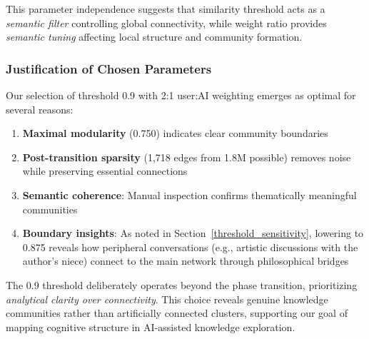 This parameter independence suggests that similarity threshold acts as a \emph{semantic filter} controlling global connectivity, while weight ratio provides \emph{semantic tuning} affecting local structure and community formation.

\subsubsection{Justification of Chosen Parameters}

Our selection of threshold 0.9 with 2:1 user:AI weighting emerges as optimal for several reasons:

\begin{enumerate}
    \item \textbf{Maximal modularity} (0.750) indicates clear community boundaries
    \item \textbf{Post-transition sparsity} (1,718 edges from 1.8M possible) removes noise while preserving essential connections
    \item \textbf{Semantic coherence}: Manual inspection confirms thematically meaningful communities
    \item \textbf{Boundary insights}: As noted in Section~\ref{threshold_sensitivity}, lowering to 0.875 reveals how peripheral conversations (e.g., artistic discussions with the author's niece) connect to the main network through philosophical bridges
\end{enumerate}

The 0.9 threshold deliberately operates beyond the phase transition, prioritizing \emph{analytical clarity over connectivity}. This choice reveals genuine knowledge communities rather than artificially connected clusters, supporting our goal of mapping cognitive structure in AI-assisted knowledge exploration.